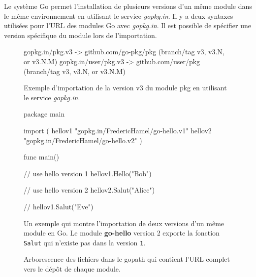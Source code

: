 Le système Go permet l'installation de plusieurs versions d'un même module dans
le même environnement en utilisant le service \textit{gopkg.in}. Il y a deux
syntaxes utilisées pour l'URL des modules Go avec \textit{gopkg.in}. Il est possible
de spécifier une version spécifique du module lors de l'importation.

\noindent
\begin{figure}[ht]
  \centering
  \fontsize{12}{10}
\begin{mplisting}{1}
gopkg.in/pkg.v3      -> github.com/go-pkg/pkg (branch/tag v3, v3.N, or v3.N.M)
gopkg.in/user/pkg.v3 -> github.com/user/pkg   (branch/tag v3, v3.N, or v3.N.M)
\end{mplisting}
  \caption{Exemple d'importation de la version v3 du module pkg en utilisant
    le service \textit{gopkg.in}.}
  \label{fig:gopkg_import}
\end{figure}

\begin{figure}[ht]
  \fontsize{12}{10}
\begin{mplisting}{1}
package main

import (
  hellov1 "gopkg.in/FredericHamel/go-hello.v1"
  hellov2 "gopkg.in/FredericHamel/go-hello.v2"
)

func main() {
  // use hello version 1
  hellov1.Hello("Bob")

  // use hello version 2
  hellov2.Salut("Alice")

  // hellov1.Salut("Eve")
}
\end{mplisting}
  \caption{Un exemple qui montre l'importation de deux versions d'un même module
    en Go. Le module \textbf{go-hello} version 2 exporte la fonction \texttt{Salut}
    qui n'existe pas dans la version \texttt{1}.}
\end{figure}


\begin{figure}[ht]
  \centering
  \lstset{frame=single}
  \vspace*{4ex}
  \fontsize{12}{10}
  \caption{Arborescence des fichiers dans le gopath qui contient
    l'URL complet vers le dépôt de chaque module.}
  \label{fig:organisation_go}
\end{figure}

